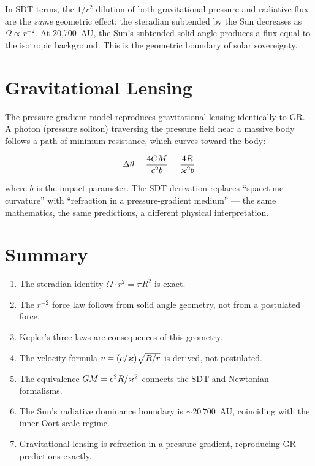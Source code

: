 In SDT terms, the $1/r^2$ dilution of both gravitational pressure and radiative flux are the \emph{same} geometric effect: the steradian subtended by the Sun decreases as $\Omega \propto r^{-2}$. At 20,700~AU, the Sun's subtended solid angle produces a flux equal to the isotropic background. This is the geometric boundary of solar sovereignty.


\section{Gravitational Lensing}

The pressure-gradient model reproduces gravitational lensing identically to GR. A photon (pressure soliton) traversing the pressure field near a massive body follows a path of minimum resistance, which curves toward the body:

\begin{equation}
  \Delta\theta = \frac{4GM}{c^2 b} = \frac{4R}{\varkappa^2 b}
\end{equation}

where $b$ is the impact parameter. The SDT derivation replaces ``spacetime curvature'' with ``refraction in a pressure-gradient medium'' --- the same mathematics, the same predictions, a different physical interpretation.


\section{Summary}

\begin{enumerate}
  \item The steradian identity $\Omega \cdot r^2 = \pi R^2$ is exact.
  \item The $r^{-2}$ force law follows from solid angle geometry, not from a postulated force.
  \item Kepler's three laws are consequences of this geometry.
  \item The velocity formula $v = (c/\varkappa)\sqrt{R/r}$ is derived, not postulated.
  \item The equivalence $GM = c^2 R/\varkappa^2$ connects the SDT and Newtonian formalisms.
  \item The Sun's radiative dominance boundary is $\sim 20\,700$~AU, coinciding with the inner Oort-scale regime.
  \item Gravitational lensing is refraction in a pressure gradient, reproducing GR predictions exactly.
\end{enumerate}
